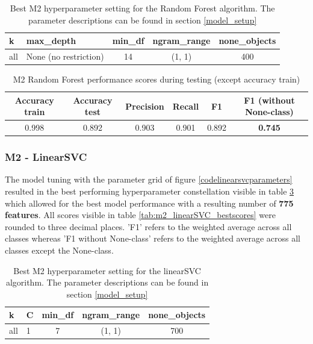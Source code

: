 \begin{table}[!htb] %
\begin{center}
\caption{Best M2 hyperparameter setting for the Random Forest algorithm. The parameter descriptions can be found in section \ref{model_setup}}\vspace{1ex}
\label{tab:m2_randomForest_bestParams}
\begin{tabular}{llccc}\hline
k & max\_depth & min\_df & ngram\_range & none\_objects \\ \hline
all & None (no restriction) & 14 & (1, 1) & 400 \\ \hline
\end{tabular}
\end{center}
\end{table}

\begin{table}[!htb] %
\begin{center}
\caption{M2 Random Forest performance scores during testing (except accuracy train)}\vspace{1ex}
\label{tab:m2_randomForest_bestscores}
\begin{tabular}{cccccc}\hline
Accuracy train & Accuracy test & Precision & Recall & F1 & F1 (without None-class)\\ \hline
0.998 & 0.892 & 0.903 & 0.901 & 0.892 & \textbf{0.745}\\ \hline
\end{tabular}
\end{center}
\end{table}

\subsubsection{M2 - LinearSVC}
The model tuning with the parameter grid of figure \ref{codelinearsvcparameters} resulted in the best performing hyperparameter constellation visible in table \ref{tab:m2_linearSVC_bestParams} which allowed for the best model performance with a resulting number of \textbf{775 features}. All scores visible in table \ref{tab:m2_linearSVC_bestscores} were rounded to three decimal places. 'F1' refers to the weighted average across all classes whereas 'F1 without None-class' refers to the weighted average across all classes except the None-class.

\begin{table}[!htb] %
\begin{center}
\caption{Best M2 hyperparameter setting for the linearSVC algorithm. The parameter descriptions can be found in section \ref{model_setup}}\vspace{1ex}
\label{tab:m2_linearSVC_bestParams}
\begin{tabular}{llccc}\hline
k & C & min\_df & ngram\_range & none\_objects \\ \hline
all & 1 & 7 & (1, 1) & 700 \\ \hline
\end{tabular}
\end{center}
\end{table}

